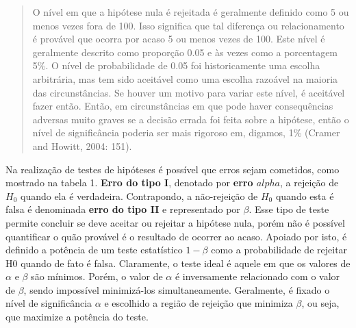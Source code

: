 \documentclass[12pt,fleqn]{article}
\begin{document}
{\begin{quote}
O nível em que a hipótese nula é rejeitada é geralmente definido como 5 ou menos vezes fora de 100. Isso significa que tal diferença ou relacionamento é provável que ocorra por acaso 5 ou menos vezes de 100. Este nível é geralmente descrito como proporção 0.05 e às vezes como a porcentagem 5\%. O nível de probabilidade de 0.05 foi historicamente uma escolha arbitrária, mas tem sido aceitável como uma escolha razoável na maioria das circunstâncias. Se houver um motivo para variar este nível, é aceitável fazer então. Então, em circunstâncias em que pode haver consequências adversas muito graves se a decisão errada foi feita sobre a hipótese, então o nível de significância poderia ser mais rigoroso em, digamos, 1\% (Cramer and Howitt, 2004: 151).
\end{quote}

Na realização de testes de hipóteses é possível que erros sejam cometidos, como mostrado na tabela 1. \textbf{Erro do tipo I}, denotado por \textbf{erro $alpha$}, a rejeição de $H_0$ quando ela é verdadeira. Contrapondo, a não-rejeição de $H_0$ quando esta é falsa é denominada \textbf{erro do tipo II} e representado por \textbf{$\beta$}.  Esse tipo de teste permite concluir se deve aceitar ou rejeitar a hipótese nula, porém não é possível quantificar o quão provável é o resultado de ocorrer ao acaso. Apoiado por isto, é definido a potência de um teste estatístico $1-\beta$ como a probabilidade de rejeitar H0 quando de fato é falsa. Claramente, o teste ideal é aquele em que os valores de $\alpha$ e $\beta$ são mínimos. Porém, o valor de $\alpha$ é inversamente relacionado com o valor de $\beta$, sendo impossível minimizá-los simultaneamente. Geralmente, é fixado o nível de significância $\alpha$ e escolhido a região de rejeição que minimiza $\beta$, ou seja, que maximize a potência do teste. 

\begin{table}[H] %
\caption{Tipos de erros em testes de hipótese}
\vspace{12pt}
\centering{}
\end{table}

}
\end{document}
